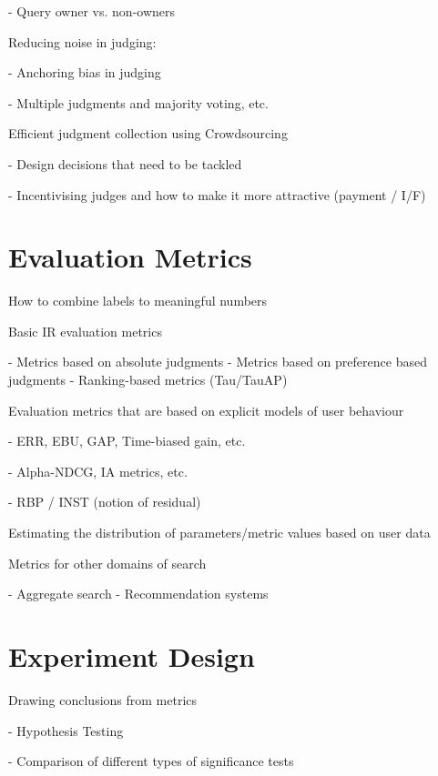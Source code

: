 \documentclass[openany]{now} %
\newcommand{\newpar}{\bigskip\noindent}
\begin{document}
- Query owner vs. non-owners \cite{Chouldechova:2013}

\newpar
Reducing noise in judging: 

- Anchoring bias in judging \cite{Shokouhi:2015}

- Multiple judgments and majority voting, etc. \cite{Venanzi:2014}

\newpar
Efficient judgment collection using Crowdsourcing

-	Design decisions that need to be tackled  \cite{Blanco:2011} \cite{Kazai2012} \cite{Alonso2012} \cite{Alonso:2015} \cite{Scholer:2013} 

-	Incentivising judges and how to make it more attractive (payment / I/F)
\cite{Megorskaya2015} \cite{Davtyan2015}  \cite{Rokicki:2014}  \cite{Eickhoff:2012}

\chapter{Evaluation Metrics}
\label{c-metrics}

How to combine labels to meaningful numbers

Basic IR evaluation metrics

- Metrics based on absolute judgments
- Metrics based on preference based judgments	
- Ranking-based metrics (Tau/TauAP)

\newpar
Evaluation metrics that are based on explicit models of user behaviour

-	ERR, EBU, GAP, Time-biased gain, etc.

-	Alpha-NDCG, IA metrics, etc.

-	RBP / INST (notion of residual)

\newpar
Estimating the distribution of parameters/metric values based on user data

\cite{CarteretteKY11}

\newpar
Metrics for other domains of search

- Aggregate search \cite{Zhou:2013}
- Recommendation systems \cite{gunawardana2015evaluating}

\chapter{Experiment Design}
\label{c-experiment-design}

Drawing conclusions from metrics

- Hypothesis Testing \cite{Dincer:2014}

- Comparison of different types of significance tests \cite{SmuckerAC09}
\end{document}
